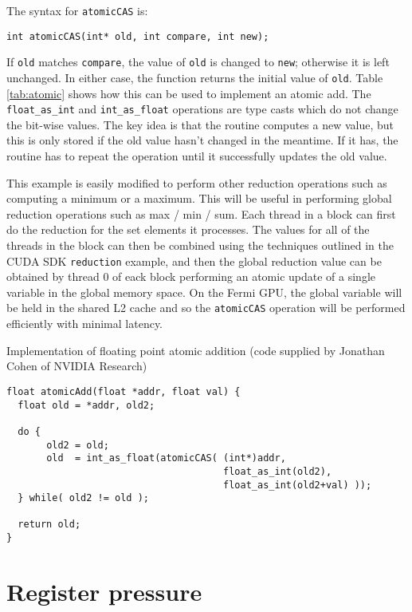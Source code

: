 \documentclass[12pt]{article}
\begin{document}
The syntax for {\tt atomicCAS} is:

{\tt int atomicCAS(int* old, int compare, int new);}

\noindent
If {\tt old} matches {\tt compare}, the value of {\tt old} is changed
to {\tt new}; otherwise it is left unchanged.  In either case, the
function returns the initial value of {\tt old}.
Table \ref{tab:atomic} shows how this can be used to implement 
an atomic add.  The \verb!float_as_int! and \verb!int_as_float!
operations are type casts which do not change the bit-wise values.
The key idea is that the routine computes a new value, but this is 
only stored if the old value hasn't changed in the meantime.
If it has, the routine has to repeat the operation until
it successfully updates the old value.

This example is easily modified to perform other reduction 
operations such as computing a minimum or a maximum.  This 
will be useful in performing global reduction operations
such as max / min / sum.  Each thread in a block can first 
do the reduction for the set elements it processes.  The 
values for all of the threads in the block can then be 
combined using the techniques outlined in the CUDA SDK 
{\tt reduction} example, and then the global reduction 
value can be obtained by thread 0 of eack block performing
an atomic update of a single variable in the global memory 
space.  On the Fermi GPU, the global variable will be held 
in the shared L2 cache and so the {\tt atomicCAS} operation 
will be performed efficiently with minimal latency.

\begin{table}
\caption{Implementation of floating point atomic addition
        (code supplied by Jonathan Cohen of NVIDIA Research)}
\label{tab:atomic}
\begin{verbatim}
float atomicAdd(float *addr, float val) {
  float old = *addr, old2;

  do {
       old2 = old;
       old  = int_as_float(atomicCAS( (int*)addr,
                                      float_as_int(old2),
                                      float_as_int(old2+val) ));
  } while( old2 != old );

  return old;
}
\end{verbatim}
\end{table}

\newpage

\section{Register pressure}
\end{document}

